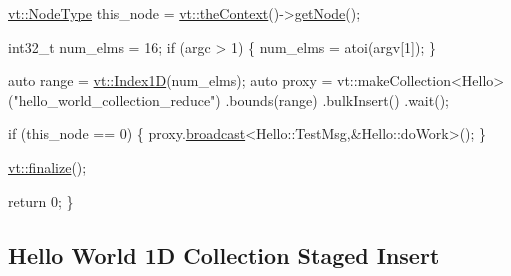 \begin{DoxyCodeInclude}
  \hyperlink{namespacevt_a866da9d0efc19c0a1ce79e9e492f47e2}{vt::NodeType} this\_node = \hyperlink{namespacevt_a26551fe0e6e6a1371111df5b12c7e92c}{vt::theContext}()->\hyperlink{structvt_1_1ctx_1_1_context_a0d52c263ce8516546a67443d9a86fa5f}{getNode}();

  int32\_t num\_elms = 16;
  \textcolor{keywordflow}{if} (argc > 1) \{
    num\_elms = atoi(argv[1]);
  \}

  \textcolor{keyword}{auto} range = \hyperlink{namespacevt_a5540efc78234273e1796fb003fe4d234}{vt::Index1D}(num\_elms);
  \textcolor{keyword}{auto} proxy = vt::makeCollection<Hello>(\textcolor{stringliteral}{"hello\_world\_collection\_reduce"})
    .bounds(range)
    .bulkInsert()
    .wait();

  \textcolor{keywordflow}{if} (this\_node == 0) \{
    proxy.\hyperlink{structvt_1_1objgroup_1_1proxy_1_1_proxy_a0b716ca776b1f06e0d7d45afbe9e5274}{broadcast}<Hello::TestMsg,&Hello::doWork>();
  \}

  \hyperlink{namespacevt_a540d90dbd6e97b69f1dcbc9ee9314cff}{vt::finalize}();

  \textcolor{keywordflow}{return} 0;
\}
\end{DoxyCodeInclude}
 \hypertarget{collection_staged-insert-hello-world-collection}{}\subsection{Hello World 1\+D Collection Staged Insert}\label{collection_staged-insert-hello-world-collection}

